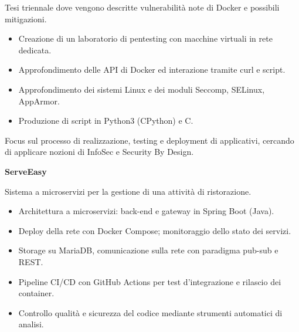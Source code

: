 \documentclass[a4paper]{letter}
\begin{document}
\begin{minipage}[t]{0.65\textwidth}
{\small Tesi triennale dove vengono descritte vulnerabilità note di Docker e possibili mitigazioni. }

\begin{itemize}
    \item Creazione di un laboratorio di pentesting con macchine virtuali in rete dedicata.
    \item Approfondimento delle API di Docker ed interazione tramite curl e script.
    \item Approfondimento dei sistemi Linux e dei moduli Seccomp, SELinux, AppArmor.
    \item Produzione di script in Python3 (CPython) e C.
\end{itemize}
\vspace{1 mm}

\vspace{0.15 cm}

\makeatletter
\newcommand{\ProgettiMagistraleBox}{%
}
\makeatother

\ProgettiMagistraleBox

\vspace{0.8 cm}

Focus sul processo di realizzazione, testing e deployment di applicativi, cercando di applicare nozioni di InfoSec e Security By Design.

\vspace{2 mm}
{\large \textbf{ServeEasy}}

{\small Sistema a microservizi per la gestione di una attività di ristorazione. }
\vspace{1 mm}
\begin{itemize}
    \item Architettura a microservizi: back-end e gateway in Spring Boot (Java).
    \item Deploy della rete con Docker Compose; monitoraggio dello stato dei servizi.
    \item Storage su MariaDB, comunicazione sulla rete con paradigma pub-sub e REST.
    \item Pipeline CI/CD con GitHub Actions per test d'integrazione e rilascio dei container.
    \item Controllo qualità e sicurezza del codice mediante strumenti automatici di analisi.
\end{itemize}


\end{minipage}
\end{document}
